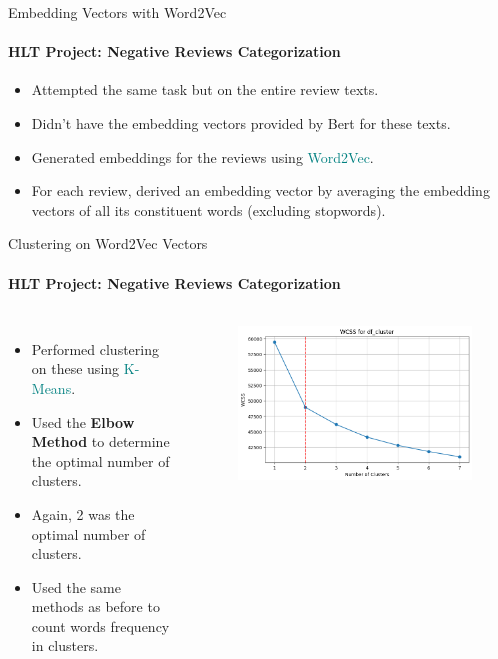 \documentclass{beamer}
\theoremstyle{definition}
\theoremstyle{plain}
\begin{document}
\begin{frame}{Embedding Vectors with Word2Vec}
\framesubtitle{HLT Project: Negative Reviews Categorization}
{\small
\begin{itemize}
    \item Attempted the same task but on the entire review texts.
    \item Didn't have the embedding vectors provided by Bert for these texts.
    \item Generated embeddings for the reviews using \textcolor{teal}{Word2Vec}.
    \item For each review, derived an embedding vector by averaging the embedding vectors of all its constituent words (excluding stopwords).
\end{itemize}
}
\end{frame}

\begin{frame}{Clustering on Word2Vec Vectors}
\framesubtitle{HLT Project: Negative Reviews Categorization}
{\small

\begin{columns}
    \begin{itemize}
        \item Performed clustering on these using \textcolor{teal}{K-Means}.
        \item Used the \textbf{Elbow Method} to determine the optimal number of clusters.
        \item Again, 2 was the optimal number of clusters.
        \item Used the same methods as before to count words frequency in clusters.
    \end{itemize}

    \begin{figure}
        \centering
        \includegraphics[scale=0.35]{Figures/elbow2.png}
    \end{figure}
\end{columns}
}
\end{frame}
\end{document}
